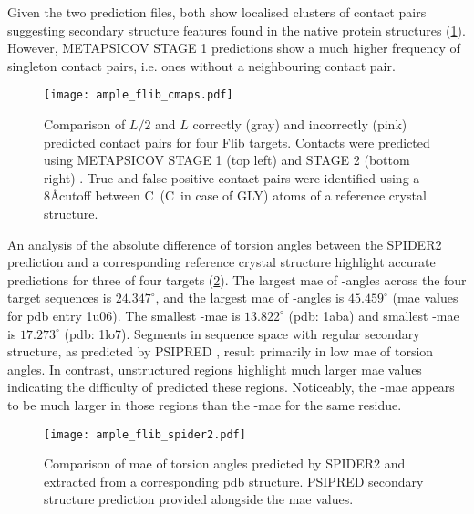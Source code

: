 Given the two prediction files, both show localised clusters of contact pairs suggesting
 secondary structure features found in the native protein structures (\cref{fig:ample_flib_cmaps}). However, METAPSICOV STAGE 1 predictions show a much higher frequency of singleton contact pairs, i.e. ones without a neighbouring contact pair.

\begin{figure}[H]
	\centering
	\texttt{[image: ample\_flib\_cmaps.pdf]}
	\caption[Contact map comparison for Flib targets]{Comparison of $L/2$ and $L$ correctly (gray) and incorrectly (pink) predicted contact pairs for four Flib targets. Contacts were predicted using METAPSICOV STAGE 1 (top left) and STAGE 2 (bottom right) \cite{Jones2015-wp}. True and false positive contact pairs were identified using a 8\AA cutoff between C\textalpha\ (C\textbeta\ in case of GLY) atoms of a reference crystal structure.}
	\label{fig:ample_flib_cmaps}
\end{figure}

An analysis of the absolute difference of torsion angles between the SPIDER2 \cite{Heffernan2015-wp} prediction and a corresponding reference crystal structure highlight accurate predictions for three of four targets (\cref{fig:ample_flib_spider2}). The largest \gls{mae} of \textphi-angles across the four target sequences is $24.347^{\circ}$, and the largest \gls{mae} of \textpsi-angles is $45.459^{\circ}$ (\gls{mae} values for \gls{pdb} entry 1u06). The smallest \textphi-\gls{mae} is $13.822^{\circ}$ (\gls{pdb}: 1aba) and smallest \textpsi-\gls{mae} is $17.273^{\circ}$ (\gls{pdb}: 1lo7). Segments in sequence space with regular secondary structure, as predicted by PSIPRED \cite{Jones1999-fi}, result primarily in low \gls{mae} of torsion angles. In contrast, unstructured regions highlight much larger \gls{mae} values indicating the difficulty of predicted these regions. Noticeably, the \textpsi-\gls{mae} appears to be much larger in those regions than the \textphi-\gls{mae} for the same residue.

\begin{figure}[H]
	\centering
	\texttt{[image: ample\_flib\_spider2.pdf]}
	\caption[SPIDER2 torsion angle prediction analysis of Flib targets]{Comparison of \gls{mae} of torsion angles predicted by SPIDER2 and extracted from a corresponding \gls{pdb} structure. PSIPRED \cite{Jones1999-fi} secondary structure prediction provided alongside the \gls{mae} values.}
	\label{fig:ample_flib_spider2}
\end{figure}

